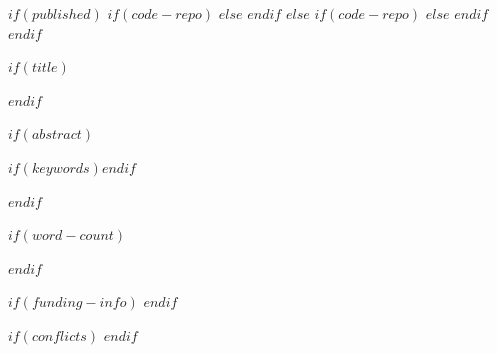 

$if(published)$
$if(code-repo)$
$else$
$endif$
$else$
$if(code-repo)$
$else$
$endif$
$endif$

\vspace{0.25in}

$if(title)$
\maketitle
$endif$

\vspace{0.25in}


$if(abstract)$
\begin{abstract}
\noindent            %
$abstract$
\end{abstract}

\vspace{\baselineskip}

$if(keywords)$\indent {}$endif$

$endif$

\vspace{0.25in}


$if(word-count)$
{
\begin{center}
\end{center}
}
$endif$

\vspace{0.25in}


$if(funding-info)$
\noindent
{}
$endif$


$if(conflicts)$
\noindent
{}
$endif$

\restoregeometry